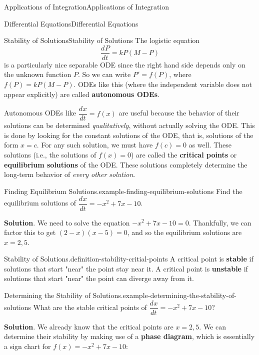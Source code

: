 \documentclass[10pt,]{book}
\newcommand{\terminology}[1]{\textbf{#1}}
\numberwithin{equation}{section}
\newcommand{\dv}[3][]{\dfrac{d^{#1} #2}{d #3^{#1}}}
\begin{document}
\begin{chapterptx}{Applications of Integration}{}{Applications of Integration}{}{}
\begin{sectionptx}{Differential Equations}{}{Differential Equations}{}{}
%
\begin{subsectionptx}{Stability of Solutions}{}{Stability of Solutions}{}{}\label{subsection-stability-of-solutions}
\hypertarget{p-752}{}%
The logistic equation%
\begin{equation*}
\dv{P}{t} = kP(M-P)
\end{equation*}
is a particularly nice separable ODE since the right hand side depends only on the unknown function \(P\). So we can write \(P' = f(P)\), where \(f(P) = kP(M-P)\). ODEs like this (where the independent variable does not appear explicitly) are called \terminology{autonomous ODEs}.%
\par
\hypertarget{p-753}{}%
Autonomous ODEs like \(\dv{x}{t} = f(x)\) are useful because the behavior of their solutions can be determined \emph{qualitatively}, without actually solving the ODE. This is done by looking for the constant solutions of the ODE, that is, solutions of the form \(x = c\). For any such solution, we must have \(f(c) = 0\) as well. These solutions (i.e., the solutions of \(f(x) = 0\)) are called the \terminology{critical points} or \terminology{equilibrium solutions} of the ODE. These solutions completely determine the long-term behavior of \emph{every other solution}.%
\begin{example}{Finding Equilibrium Solutions.}{example-finding-equilibrium-solutions}%
\hypertarget{p-754}{}%
Find the equilibrium solutions of \(\dv{x}{t} = -x^{2} + 7x - 10\).%
\par\smallskip%
\noindent\textbf{Solution}.\hypertarget{solution-158}{}\quad%
\hypertarget{p-755}{}%
We need to solve the equation \(-x^{2} + 7x - 10 = 0\). Thankfully, we can factor this to get \((2-x)(x-5) = 0\), and so the equilibrium solutions are \(x = 2,5\).%
\end{example}
\begin{definition}{Stability of Solutions.}{definition-stability-critial-points}%
\hypertarget{p-756}{}%
A critical point is \terminology{stable} if solutions that start "near" the point stay near it. A critical point is \terminology{unstable} if solutions that start "near" the point can diverge away from it.%
\end{definition}
\begin{example}{Determining the Stability of Solutions.}{example-determining-the-stability-of-solutions}%
\hypertarget{p-757}{}%
What are the stable critical points of \(\dv{x}{t} = -x^{2} + 7x - 10\)?%
\par\smallskip%
\noindent\textbf{Solution}.\hypertarget{solution-159}{}\quad%
\hypertarget{p-758}{}%
We already know that the critical points are \(x = 2, 5\). We can determine their stability by making use of a \terminology{phase diagram}, which is essentially a sign chart for \(f(x) = -x^{2} + 7x - 10\):%
\begin{figure}
\centering
{
}
\end{figure}
\end{example}
\end{subsectionptx}
\end{sectionptx}
\end{chapterptx}
\end{document}
